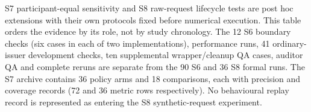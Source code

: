 \begin{table}[!htbp]
\begin{tabularx}{\linewidth}{@{}>{\raggedright\arraybackslash}p{0.17\linewidth}>{\raggedright\arraybackslash}p{0.25\linewidth}>{\raggedright\arraybackslash}X>{\raggedright\arraybackslash}p{0.18\linewidth}@{}}
\bottomrule
\end{tabularx}
\par\smallskip
\begin{minipage}{\linewidth}\small
S7 participant-equal sensitivity and S8 raw-request lifecycle tests are post hoc extensions with their own protocols fixed before numerical execution. This table orders the evidence by its role, not by study chronology. The 12 S6 boundary checks (six cases in each of two implementations), performance runs, 41 ordinary-issuer development checks, ten supplemental wrapper/cleanup QA cases, auditor QA and complete reruns are separate from the 90 S6 and 36 S8 formal runs. The S7 archive contains 36 policy arms and 18 comparisons, each with precision and coverage records (72 and 36 metric rows respectively). No behavioural replay record is represented as entering the S8 synthetic-request experiment.
\end{minipage}
\end{table}
